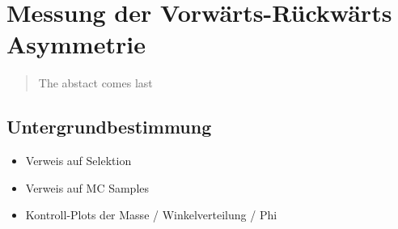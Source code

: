 


\chapter{Messung der Vorwärts-Rückwärts Asymmetrie}

\begin{quote}
    The abstact comes last
\end{quote}



\section{Untergrundbestimmung}
\label{afb:kinematics}

\begin{itemize}
    \item Verweis auf Selektion
    \item Verweis auf MC Samples
    \item Kontroll-Plots der Masse / Winkelverteilung / Phi
\end{itemize}




